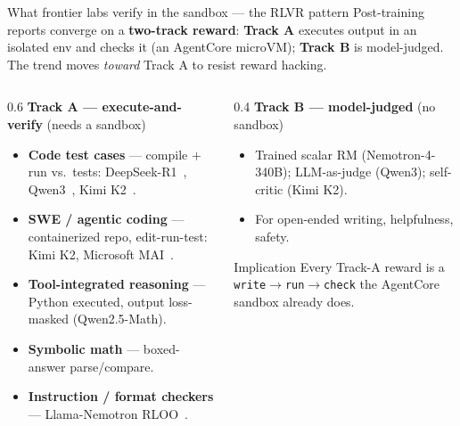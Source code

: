 \documentclass[aspectratio=169]{beamer}
\begin{document}
\begin{frame}{What frontier labs verify in the sandbox --- the RLVR pattern}
  \footnotesize Post-training reports converge on a \textbf{two-track reward}: \textbf{Track A} executes
  output in an isolated env and checks it (an AgentCore microVM); \textbf{Track B} is model-judged. The
  trend moves \emph{toward} Track A to resist reward hacking.
  \begin{columns}[T]
    \begin{column}{0.6\textwidth}
      \textbf{Track A --- execute-and-verify} (needs a sandbox)
      \begin{itemize}\scriptsize\setlength\itemsep{0em}
        \item \textbf{Code test cases} --- compile $+$ run vs.\ tests: DeepSeek-R1~\cite{deepseekr1},
          Qwen3~\cite{qwen3}, Kimi K2~\cite{kimik2}.
        \item \textbf{SWE / agentic coding} --- containerized repo, edit-run-test: Kimi K2, Microsoft MAI~\cite{mai}.
        \item \textbf{Tool-integrated reasoning} --- Python executed, output loss-masked (Qwen2.5-Math).
        \item \textbf{Symbolic math} --- boxed-answer parse/compare.
        \item \textbf{Instruction / format checkers} --- Llama-Nemotron RLOO~\cite{llamanemotron}.
      \end{itemize}
    \end{column}
    \begin{column}{0.4\textwidth}
      \textbf{Track B --- model-judged} (no sandbox)
      \begin{itemize}\scriptsize\setlength\itemsep{0.03em}
        \item Trained scalar RM (Nemotron-4-340B); LLM-as-judge (Qwen3); self-critic (Kimi K2).
        \item For open-ended writing, helpfulness, safety.
      \end{itemize}
      \begin{block}{Implication}
        \scriptsize Every Track-A reward is a \texttt{write}$\to$\texttt{run}$\to$\texttt{check}
        the AgentCore sandbox already does.
      \end{block}
    \end{column}
  \end{columns}
\end{frame}

\end{document}
